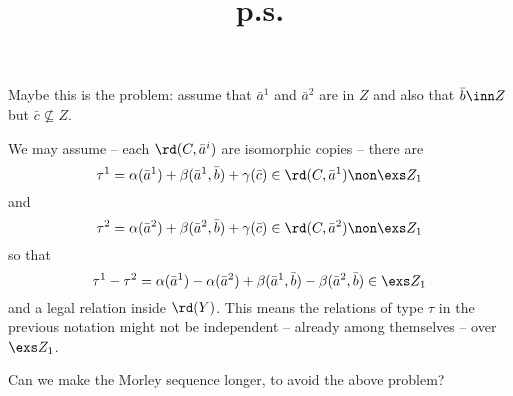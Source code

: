 \documentclass[11pt,german]{article}
\begin{document}
\title{p.s.}
\author{}
\date{}
\maketitle
Maybe this is the problem: assume that $\bar a^{1}$ and $\bar a^{2}$ are in $Z$ and also that $\bar b\inn Z$
but $\bar c\nsubseteq Z$.

\medskip
We may assume -- each $\rd(C,\bar a^{i})$ are isomorphic copies -- there are
$$
\tau^{1}=\alpha(\bar a^{1})+\beta(\bar a^{1}, \bar b)+\gamma(\bar c)\in\rd(C,\bar a^{1})\non\exs Z_{1}
$$
and
$$
\tau^{2}=\alpha(\bar a^{2})+\beta(\bar a^{2}, \bar b)+\gamma(\bar c)\in\rd(C,\bar a^{2})\non\exs Z_{1}
$$
so that
$$
\tau^{1}-\tau^{2}=\alpha(\bar a^{1})-\alpha(\bar a^{2})+\beta(\bar a^{1},\bar b)-\beta(\bar a^{2},\bar b)\in\exs Z_{1}
$$
and a legal relation inside $\rd(Y)$. This means the relations of type $\tau$ in the previous notation
might not be independent -- already among themselves -- over $\exs Z_{1}$.

\bigskip
Can we make the Morley sequence longer, to avoid the above problem?
\end{document}
